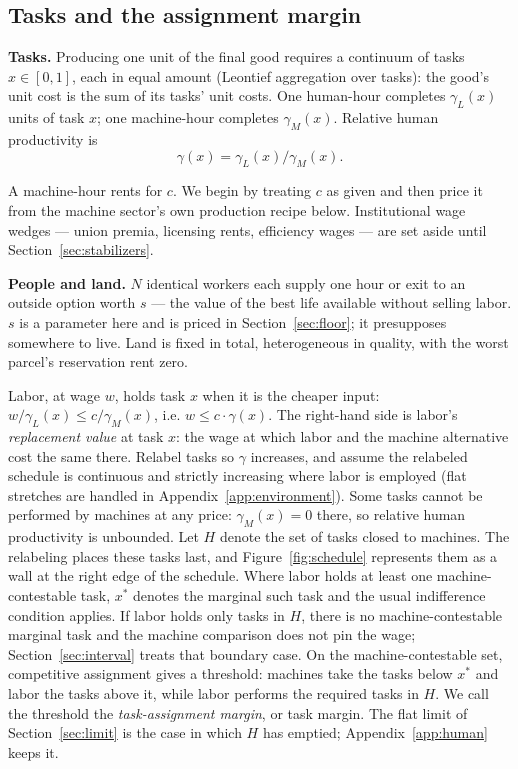\documentclass[12pt]{article}
\theoremstyle{plain}
\begin{document}
\subsection{Tasks and the assignment margin}

\textbf{Tasks.} Producing one unit of the final good requires a continuum of tasks
$x \in [0,1]$, each in equal amount (Leontief aggregation over tasks): the good's
unit cost is the sum of its tasks' unit costs. One human-hour completes
$\gamma_L(x)$ units of task $x$; one machine-hour completes $\gamma_M(x)$.
Relative human productivity is
\begin{equation}\label{eq:gamma}
\gamma(x) = \gamma_L(x) / \gamma_M(x).
\end{equation}

A machine-hour rents for $c$. We begin by treating $c$ as given and then price it
from the machine sector's own production recipe below. Institutional wage wedges
--- union premia, licensing rents, efficiency wages --- are set aside until
Section~\ref{sec:stabilizers}.

\textbf{People and land.} $N$ identical workers each supply one hour or exit to an
outside option worth $s$ --- the value of the best life available without selling
labor. $s$ is a parameter here and is priced in Section~\ref{sec:floor}; it
presupposes somewhere to live. Land is fixed in total, heterogeneous in quality,
with the worst parcel's reservation rent zero.

Labor, at wage $w$, holds task $x$ when it is the cheaper input:
$w/\gamma_L(x) \le c/\gamma_M(x)$, i.e.
$w \le c\cdot\gamma(x)$. The right-hand side is labor's \emph{replacement value} at task $x$: the wage at which labor and the machine alternative cost the same there. Relabel tasks so $\gamma$ increases, and assume the
relabeled schedule is continuous and strictly increasing where labor is employed
(flat stretches are handled in Appendix~\ref{app:environment}). Some tasks cannot be performed by machines at any price:
$\gamma_M(x)=0$ there, so relative human productivity is unbounded.
Let $H$ denote the set of tasks closed to machines. The relabeling places
these tasks last, and Figure~\ref{fig:schedule} represents them as a wall at
the right edge of the schedule. Where labor holds at least one
machine-contestable task, $x^*$ denotes the marginal such task and the usual
indifference condition applies. If labor holds only tasks in $H$, there is no
machine-contestable marginal task and the machine comparison does not pin the
wage; Section~\ref{sec:interval} treats that boundary case. On the
machine-contestable set, competitive assignment gives a threshold: machines
take the tasks below $x^*$ and labor the tasks above it, while labor performs
the required tasks in $H$. We call the threshold the \emph{task-assignment margin}, or task margin. The flat limit of Section~\ref{sec:limit} is the
case in which $H$ has emptied; Appendix~\ref{app:human} keeps it.
\end{document}
